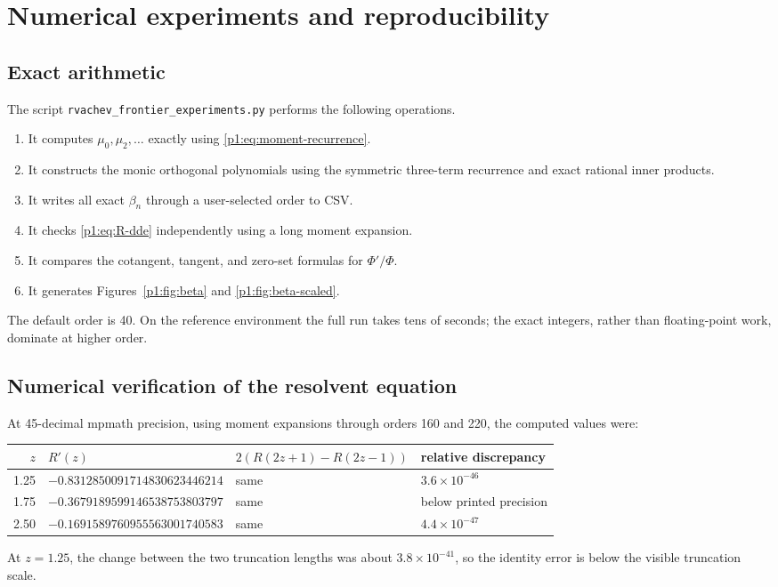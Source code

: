 \documentclass[11pt]{article}
\theoremstyle{definition}
\theoremstyle{remark}
\begin{document}
\section{Numerical experiments and reproducibility}

\subsection{Exact arithmetic}

The script \texttt{rvachev\_frontier\_experiments.py} performs the following operations.

\begin{enumerate}
\item It computes \(\mu_0,\mu_2,\dots\) exactly using \eqref{p1:eq:moment-recurrence}.
\item It constructs the monic orthogonal polynomials using the symmetric three-term
      recurrence and exact rational inner products.
\item It writes all exact \(\beta_n\) through a user-selected order to CSV.
\item It checks \eqref{p1:eq:R-dde} independently using a long moment expansion.
\item It compares the cotangent, tangent, and zero-set formulas for \(\Phi'/\Phi\).
\item It generates Figures~\ref{p1:fig:beta} and \ref{p1:fig:beta-scaled}.
\end{enumerate}

The default order is 40.  On the reference environment the full run takes tens of seconds;
the exact integers, rather than floating-point work, dominate at higher order.

\subsection{Numerical verification of the resolvent equation}

At 45-decimal mpmath precision, using moment expansions through orders 160 and 220, the
computed values were:
\begin{center}
\footnotesize
\begin{tabular}{rlll}
\toprule
\(z\) & \(R'(z)\) & \(2(R(2z+1)-R(2z-1))\) & relative discrepancy \\
\midrule
1.25 & \(-0.8312850091714830623446214\) & same & \(3.6\times10^{-46}\) \\
1.75 & \(-0.3679189599146538753803797\) & same & below printed precision \\
2.50 & \(-0.1691589760955563001740583\) & same & \(4.4\times10^{-47}\) \\
\bottomrule
\end{tabular}
\end{center}
At \(z=1.25\), the change between the two truncation lengths was about
\(3.8\times10^{-41}\), so the identity error is below the visible truncation scale.
\end{document}
